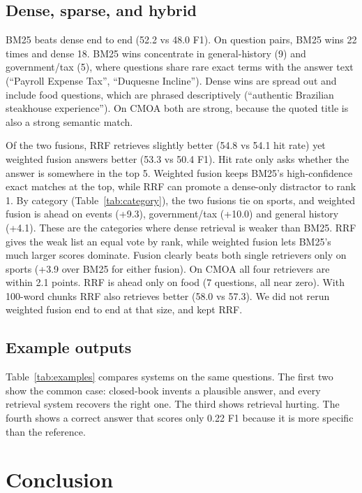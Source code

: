 \documentclass[11pt]{article}
\begin{document}
\subsection{Dense, sparse, and hybrid}

BM25 beats dense end to end (52.2 vs 48.0 F1). On question pairs, BM25 wins 22 times and dense 18. BM25 wins concentrate in general-history (9) and government/tax (5), where questions share rare exact terms with the answer text (``Payroll Expense Tax'', ``Duquesne Incline''). Dense wins are spread out and include food questions, which are phrased descriptively (``authentic Brazilian steakhouse experience''). On CMOA both are strong, because the quoted title is also a strong semantic match.

Of the two fusions, RRF retrieves slightly better (54.8 vs 54.1 hit rate) yet weighted fusion answers better (53.3 vs 50.4 F1). Hit rate only asks whether the answer is somewhere in the top 5. Weighted fusion keeps BM25's high-confidence exact matches at the top, while RRF can promote a dense-only distractor to rank 1. By category (Table~\ref{tab:category}), the two fusions tie on sports, and weighted fusion is ahead on events (+9.3), government/tax (+10.0) and general history (+4.1). These are the categories where dense retrieval is weaker than BM25. RRF gives the weak list an equal vote by rank, while weighted fusion lets BM25's much larger scores dominate. Fusion clearly beats both single retrievers only on sports (+3.9 over BM25 for either fusion). On CMOA all four retrievers are within 2.1 points. RRF is ahead only on food (7 questions, all near zero). With 100-word chunks RRF also retrieves better (58.0 vs 57.3). We did not rerun weighted fusion end to end at that size, and kept RRF.

\subsection{Example outputs}

Table~\ref{tab:examples} compares systems on the same questions. The first two show the common case: closed-book invents a plausible answer, and every retrieval system recovers the right one. The third shows retrieval hurting. The fourth shows a correct answer that scores only 0.22 F1 because it is more specific than the reference.

\section{Conclusion}
\end{document}
